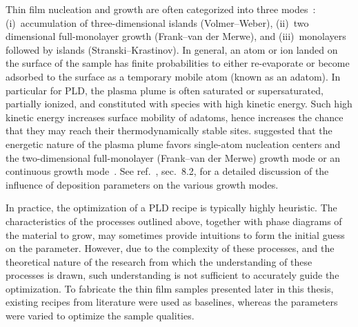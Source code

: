 Thin film nucleation and growth are often categorized into three modes~\cite{Greene1993}: (i)~accumulation of three-dimensional islands (Volmer--Weber), (ii)~two dimensional full-monolayer growth (Frank--van der Merwe), and (iii)~monolayers followed by islands (Stranski--Krastinov). In general, an atom or ion landed on the surface of the sample has finite probabilities to either re-evaporate or become adsorbed to the surface as a temporary mobile atom (known as an adatom). In particular for PLD, the plasma plume is often saturated or supersaturated, partially ionized, and constituted with species with high kinetic energy. Such high kinetic energy increases surface mobility of adatoms, hence increases the chance that they may reach their thermodynamically stable sites. \citeauthor{Metev1989} suggested that the energetic nature of the plasma plume favors single-atom nucleation centers and the two-dimensional full-monolayer (Frank--van der Merwe) growth mode or an continuous growth mode~\cite{Metev1989}. See ref.~\cite{PLD_book}, sec.~8.2, for a detailed discussion of the influence of deposition parameters on the various growth modes.

In practice, the optimization of a PLD recipe is typically highly heuristic. The characteristics of the processes outlined above, together with phase diagrams of the material to grow, may sometimes provide intuitions to form the initial guess on the parameter. However, due to the complexity of these processes, and the theoretical nature of the research from which the understanding of these processes is drawn, such understanding is not sufficient to accurately guide the optimization. To fabricate the thin film samples presented later in this thesis, existing recipes from literature were used as baselines, whereas the parameters were varied to optimize the sample qualities.